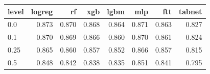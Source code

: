 \begin{tabular}{lrrrrrrr}
\toprule
level & logreg & rf & xgb & lgbm & mlp & ftt & tabnet \\
\midrule
0.0 & 0.873 & 0.870 & 0.868 & 0.864 & 0.871 & 0.863 & 0.827 \\
0.1 & 0.870 & 0.869 & 0.866 & 0.860 & 0.870 & 0.861 & 0.824 \\
0.25 & 0.865 & 0.860 & 0.857 & 0.852 & 0.866 & 0.857 & 0.815 \\
0.5 & 0.848 & 0.842 & 0.838 & 0.835 & 0.851 & 0.841 & 0.795 \\
\bottomrule
\end{tabular}
